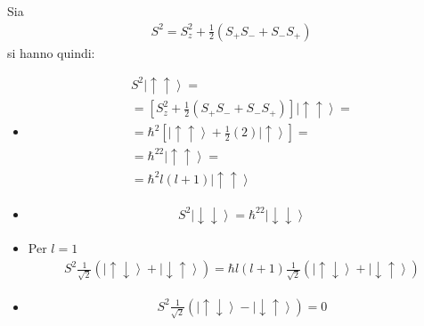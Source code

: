 Sia
\begin{equation}\begin{split}
S^2=S_z^2+\frac{1}{2}\left(S_+S_-+S_-S_+\right)
\end{split}\end{equation}
si hanno quindi:
\begin{itemize}
\item 
\begin{equation}\begin{split}
S^2\left |\uparrow \uparrow \right\rangle=\\
=\left[S_z^2+\frac{1}{2}\left(S_+S_-+S_-S_+\right)\right]\left |\uparrow \uparrow \right\rangle=\\
=\hbar ^2\left[\left |\uparrow \uparrow \right\rangle+\frac{1}{2}\left(2\right)\left |\uparrow \right\rangle\right]=\\
=\hbar ^22\left |\uparrow \uparrow \right\rangle=\\
=\hbar ^2l\left(l+1\right)\left |\uparrow\uparrow \right\rangle
\end{split}\end{equation}
\item 
\begin{equation}\begin{split}
S^2\left |\downarrow \downarrow \right\rangle=\hbar ^22\left |\downarrow \downarrow \right\rangle
\end{split}\end{equation}
\item Per $l=1$
\begin{equation}\begin{split}
S^2\frac{1}{\sqrt{2}}\left(\left |\uparrow \downarrow \right\rangle+\left |\downarrow \uparrow \right\rangle\right)=\hbar l\left(l+1\right)\frac{1}{\sqrt{2}}\left(\left |\uparrow \downarrow \right\rangle+\left |\downarrow \uparrow \right\rangle\right)
\end{split}\end{equation}
\item 
\begin{equation}\begin{split}
S^2\frac{1}{\sqrt{2}}\left(\left |\uparrow \downarrow \right\rangle-\left |\downarrow \uparrow \right\rangle\right)=0
\end{split}\end{equation}
\end{itemize}


